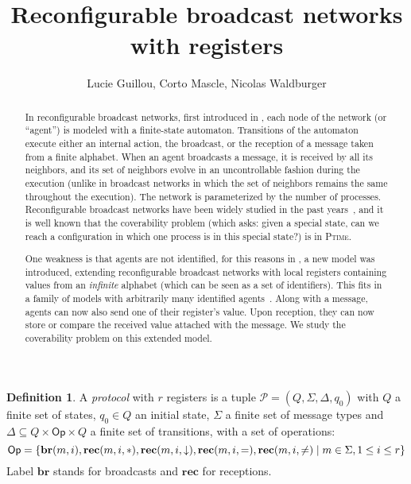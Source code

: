 \documentclass{article}
\title{Reconfigurable broadcast networks with registers}
\author{Lucie Guillou, Corto Mascle, Nicolas Waldburger}
\date{}
\newcommand{\set}[1]{\{#1\}}
\theoremstyle{definition}
\newtheorem{definition}[theorem]{Definition}
\begin{document}
	
	\maketitle
	
	\begin{abstract}
			In reconfigurable broadcast networks, first introduced in \cite{DelzannoSZ2010Adhoc}, each node of the network (or ``agent'') is modeled with a finite-state automaton. Transitions of the automaton execute either an internal action, the broadcast, or the reception of a message taken from a finite alphabet. When an agent broadcasts a message, it is received by all its neighbors, and its set of neighbors evolve in an uncontrollable fashion during the execution (unlike in broadcast networks \cite{BZ83} in which the set of neighbors remains the same throughout the execution). The network is parameterized by the number of processes. Reconfigurable broadcast networks have been widely studied in the past years~\cite{Balasubramanian18, BalasubramanianGW22}, and it is well known that the coverability problem (which asks: given a special state, can we reach a configuration in which one process is in this special state?) is in \textsc{Ptime}.
		
		One weakness is that agents are not identified, for this reasons in \cite{DelzannoST13}, a new model was introduced, extending reconfigurable broadcast networks with local registers containing values from an \emph{infinite} alphabet (which can be seen as a set of identifiers). This fits in a family of models with arbitrarily many identified agents~\cite{AbdullaAKR14}. Along with a message, agents can now also send one of their register's value. Upon reception, they can now store or compare the received value attached with the message. We study the coverability problem on this extended model.
	\end{abstract}

	
	
	\begin{definition}
		A \emph{protocol} with $r$ registers is a tuple $\mathcal{P} = (Q, \Sigma, \Delta, q_0)$  with $Q$ a finite set of states, $q_0 \in Q$ an initial state, $\Sigma$ a finite set of message types  and $\Delta \subseteq Q \times \mathsf{Op} \times Q$ a finite set of transitions, with a set of operations:\vspace{-0.3cm} \[\mathsf{Op} = \set{\mathbf{br}(m,i), \mathbf{rec}(m,i, \ast), \mathbf{rec}(m,i, \downarrow), \mathbf{rec}(m,i, =),\mathbf{rec}(m,i, \neq) \mid m \in \Sigma, 1 \leq i \leq r}\vspace{-0.3cm}\]
		Label $\mathbf{br}$ stands for broadcasts and $\mathbf{rec}$ for receptions.
		
	\end{definition}
	
\end{document}
